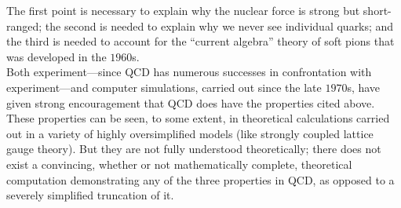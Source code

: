  The first point is necessary to explain why the nuclear force is strong but short-ranged; the second is needed to explain why we never see individual quarks; and
 the third is needed to account for the “current algebra” theory of soft pions that
 was developed in the $1960$s.\\
 Both experiment—since QCD has numerous successes in confrontation with
 experiment—and computer simulations, carried out since the
 late $1970$s, have given strong encouragement that QCD does have the properties
 cited above. These properties can be seen, to some extent, in theoretical calculations carried out in a variety of highly oversimplified models (like strongly coupled
 lattice gauge theory). But they are not fully understood
 theoretically; there does not exist a convincing, whether or not mathematically
 complete, theoretical computation demonstrating any of the three properties in
 QCD, as opposed to a severely simplified truncation of it.
